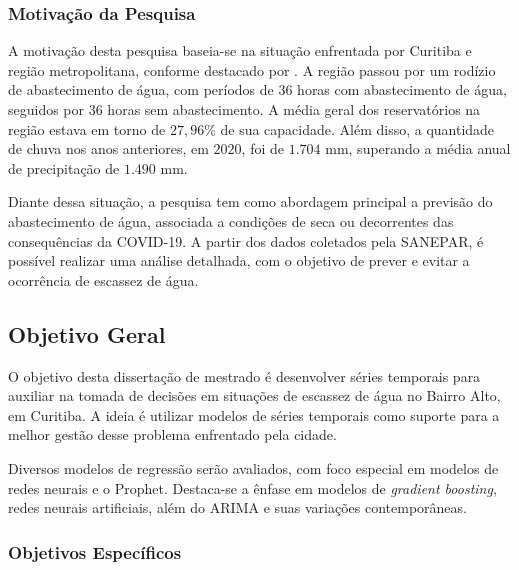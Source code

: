 \subsubsection{Motiva\c c\~ao da Pesquisa} \label{subsubsec:motivacao}

A motivação desta pesquisa baseia-se na situação enfrentada por Curitiba e região metropolitana, conforme destacado por \cite{vasconcelos_2020}. A região passou por um rodízio de abastecimento de água, com períodos de 36 horas com abastecimento de água, seguidos por 36 horas sem abastecimento. A média geral dos reservatórios na região estava em torno de $27,96\%$ de sua capacidade. Além disso, a quantidade de chuva nos anos anteriores, em $2020$, foi de $1.704$ mm, superando a média anual de precipitação de $1.490$ mm.

Diante dessa situação, a pesquisa tem como abordagem principal a previsão do abastecimento de água, associada a condições de seca ou decorrentes das consequências da COVID-19. A partir dos dados coletados pela SANEPAR, é possível realizar uma análise detalhada, com o objetivo de prever e evitar a ocorrência de escassez de água. 



\subsection{Objetivo Geral} \label{subsec:objetivos}

O objetivo desta dissertação de mestrado é desenvolver séries temporais para auxiliar na tomada de decisões em situações de escassez de água no Bairro Alto, em Curitiba. A ideia é utilizar modelos de séries temporais como suporte para a melhor gestão desse problema enfrentado pela cidade.

Diversos modelos de regressão serão avaliados, com foco especial em modelos de redes neurais e o Prophet. Destaca-se a ênfase em modelos de \textit{gradient boosting}, redes neurais artificiais, além do ARIMA e suas variações contemporâneas. 



\subsubsection{Objetivos Espec\'ificos} \label{subsubsec:obespec}



